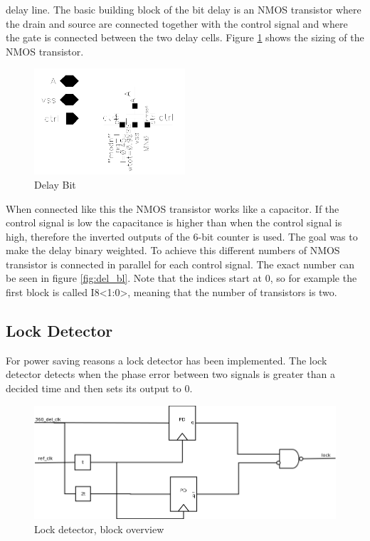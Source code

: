 \documentclass[a4paper,12pt]{article} \usepackage{graphicx}
\begin{document}
delay line. 
The basic building block of the
bit delay is an NMOS transistor where the drain and source are connected
together with the control signal and where the gate is connected between the two
delay cells. Figure \ref{fig:del_bit} shows the sizing of the NMOS transistor.
\begin{figure}[h]
        \centering
        \includegraphics[width=0.5\textwidth]{../Bilder/Delay_Line/Delay_bit.png}
        \caption{Delay Bit}
        \label{fig:del_bit}
\end{figure}
When connected like this the NMOS transistor works like a capacitor. If the control
signal is low the capacitance is higher than when the control signal is high,
therefore the inverted outputs of the 6-bit counter is used. The goal was to
make the delay binary weighted. To achieve this different numbers of NMOS
transistor is connected in parallel for each control signal. The exact number
can be seen in figure \ref{fig:del_bl}. Note that the indices start at 0, so for
example the first block is called I8<1:0>, meaning that the number of
transistors is two.

\subsection{Lock Detector}
For power saving reasons a lock detector has been implemented. The
lock detector detects when the phase error between two signals is
greater than a decided time and then sets its output to 0.

\begin{figure}[h]
        \centering
        \includegraphics[width=150mm]{../Bilder/Lockdetector.png}
        \caption{Lock detector, block overview}
        \label{fig:LD_block}
\end{figure}
\end{document}
